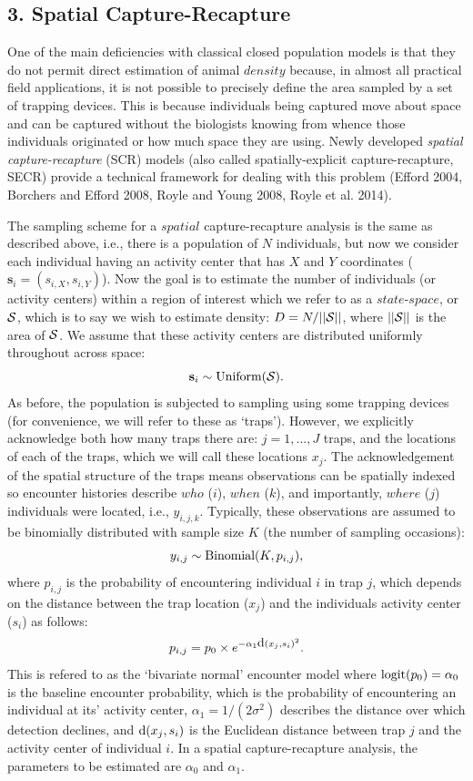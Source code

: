 \documentclass{book}
\begin{document}
\subsection*{3. Spatial Capture-Recapture}

One of the main deficiencies with classical closed population models
is that they do not permit direct estimation of animal $density$
because, in almost all practical field applications, it is not
possible to precisely define the area sampled by a set of trapping
devices. This is because individuals being captured  move about
space and can be captured without the biologists knowing from whence
those individuals originated or how much space they are using. Newly
developed {\it spatial capture-recapture} (SCR) models (also called
spatially-explicit capture-recapture, SECR) provide a technical framework for
dealing with this problem (Efford 2004, Borchers and Efford 2008,
Royle and Young 2008, Royle et al. 2014). 

The sampling scheme for a $spatial$ capture-recapture analysis is the
same as described above, i.e., there is a population of $N$
individuals, but now we consider each individual having an activity
center that has $X$ and $Y$ coordinates
($\textbf{s}_i=(s_{i,X},s_{i,Y})$). Now the goal is to estimate the
number of individuals (or activity centers) within a region of
interest which we refer to as a $state$-$space$, or ${\cal S}$, which
is to say we wish to estimate density: $D = N/||{\cal S}||$, where
$||{\cal S}||$ is the area of ${\cal S}$. We assume that these
activity centers are distributed uniformly throughout across space:
\[
\textbf{s}_i \sim \hbox{Uniform}({\cal S}).
\]
As before, the population is subjected to sampling using some trapping
devices (for convenience, we will refer to these as `traps'). However,
we explicitly acknowledge both how many traps there are: $j=1,...,J$
traps, and the locations of each of the traps, which we will call
these locations $x_j$. The acknowledgement of the spatial structure of
the traps means observations can be spatially indexed so encounter
histories describe $who$ ($i$), $when$ ($k$), and importantly, $where$
($j$) individuals were located, i.e., $y_{i,j,k}$. Typically, these
observations are assumed to be binomially distributed with sample size
$K$ (the number of sampling occasions):
\[
y_{i,j} \sim \hbox{Binomial}(K,p_{i,j}),
\]
where $p_{i,j}$ is the probability of encountering individual $i$ in
trap $j$, which depends on the distance between the trap location
($x_j$) and the individuals activity center ($s_i$) as follows:
\begin{equation}
p_{i,j} = p_0 \times e^{-\alpha_1 \hbox{d}(x_{j},s_{i})^{2}}.
\end{equation}
This is refered to as the `bivariate normal' encounter model where
$\hbox{logit}(p_0) = \alpha_0$ is the baseline encounter probability,
which is the probability of encountering an individual at its'
activity center, $\alpha_1 = 1/(2\sigma^2)$ describes the distance
over which detection declines, and $\hbox{d}(x_{j},s_{i})$ is the
Euclidean distance between trap $j$ and the activity center of
individual $i$. In a spatial capture-recapture analysis, the
parameters to be estimated are $\alpha_0$ and $\alpha_1$.
\end{document}
